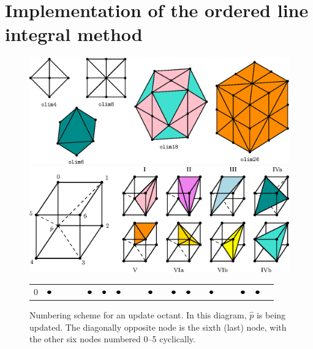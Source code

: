 \documentclass[eikonal.tex]{subfiles}
\begin{document}
  
\section{Implementation of the ordered line integral
  method}\label{sec:implementation}

\begin{figure}
  \centering
  \includegraphics[width=0.95\linewidth]{neighborhoods.eps}
  \caption{Ordered line integral method neighborhoods in 2D and 3D:
    \texttt{olim4} and \texttt{olim8} are 2D solvers and the rest are
    3D solvers. The color coding of tetrahedron updates is the same
    for this figure and \cref{fig:octant-numbering}
    below.}\label{fig:neighborhoods}%
  \includegraphics[width=0.95\linewidth]{simplex-groups.eps}
  \caption{Numbering scheme for an update octant. In this diagram,
    $\hat{p}$ is being updated. The diagonally opposite node is the
    sixth (last) node, with the other six nodes numbered 0--5
    cyclically.}\label{fig:octant-numbering}
  \vspace{-0.5em}
  {
    \footnotesize
    \begin{tabular}{c|cccccc|cccccc|cccccc|cc}
      0 & $\groupmarker$ & & & & $\groupmarker$ & $\groupmarker$ & $\groupmarker$ & & & $\groupmarker$ & & $\groupmarker$ & $\groupmarker$ & & $\groupmarker$ & & & $\groupmarker$ & $\groupmarker$ & \\

\end{tabular}}
\end{figure}
\end{document}
